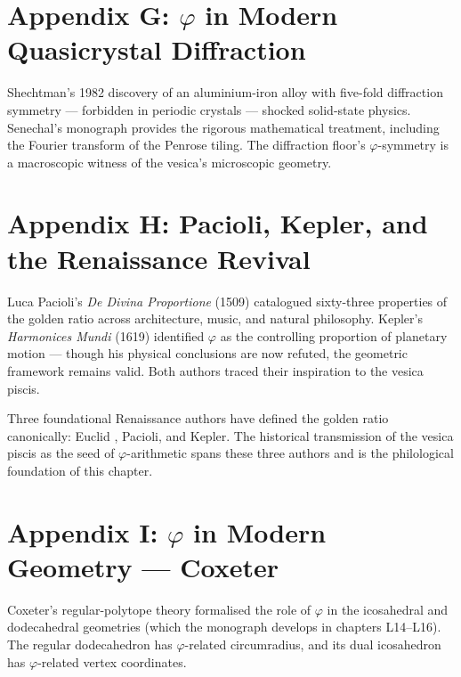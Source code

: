 \section*{Appendix G: $\varphi$ in Modern Quasicrystal Diffraction}
\label{sec:01-app-G}

Shechtman's 1982 discovery \cite{shechtman1984} of an aluminium-iron
alloy with five-fold diffraction symmetry --- forbidden in periodic
crystals --- shocked solid-state physics. Senechal's monograph
\cite{senechal_quasicrystals} provides the rigorous mathematical
treatment, including the Fourier transform of the Penrose tiling.
The diffraction floor's $\varphi$-symmetry is a macroscopic witness of
the vesica's microscopic geometry.

\section*{Appendix H: Pacioli, Kepler, and the Renaissance Revival}
\label{sec:01-app-H}

Luca Pacioli's \emph{De Divina Proportione} (1509)
\cite{pacioli_divina} catalogued sixty-three properties of the
golden ratio across architecture, music, and natural philosophy.
Kepler's \emph{Harmonices Mundi} (1619) \cite{kepler_harmonices}
identified $\varphi$ as the controlling proportion of planetary
motion --- though his physical conclusions are now refuted, the
geometric framework remains valid. Both authors traced their
inspiration to the vesica piscis.

\begin{remark}
Three foundational Renaissance authors have defined the golden ratio
canonically: Euclid \cite{euclid_elements}, Pacioli, and Kepler. The
historical transmission of the vesica piscis as the seed of
$\varphi$-arithmetic spans these three authors and is the
philological foundation of this chapter.
\end{remark}

\section*{Appendix I: $\varphi$ in Modern Geometry --- Coxeter}
\label{sec:01-app-I}

Coxeter's regular-polytope theory \cite{coxeter_regular_polytopes}
formalised the role of $\varphi$ in the icosahedral and dodecahedral
geometries (which the monograph develops in chapters L14--L16). The
regular dodecahedron has $\varphi$-related circumradius, and its dual
icosahedron has $\varphi$-related vertex coordinates.

